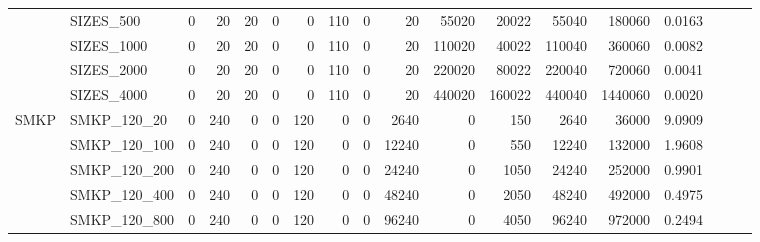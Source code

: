 \begin{table}[h]
{\begin{tabular}{llrrrrrrrrrrrrrlll}
			& SIZES\_500                   & 0            & 20          & 20         & 0            & 0           & 110        & 0       & 20       & 55020  & 20022   & 55040    & 180060     & 0.0163    &                          &                          &                          \\
			& SIZES\_1000                  & 0            & 20          & 20         & 0            & 0           & 110        & 0       & 20       & 110020 & 40022   & 110040   & 360060     & 0.0082    &                          &                          &                          \\
			& SIZES\_2000                  & 0            & 20          & 20         & 0            & 0           & 110        & 0       & 20       & 220020 & 80022   & 220040   & 720060     & 0.0041    &                          &                          &                          \\
			& SIZES\_4000                  & 0            & 20          & 20         & 0            & 0           & 110        & 0       & 20       & 440020 & 160022  & 440040   & 1440060    & 0.0020    &                          &                          &                          \\ \hline
			\multirow{5}{*}{SMKP}       & SMKP\_120\_20                & 0            & 240         & 0          & 0            & 120         & 0          & 0       & 2640     & 0      & 150     & 2640     & 36000      & 9.0909    &                          &                          &                          \\
			& SMKP\_120\_100               & 0            & 240         & 0          & 0            & 120         & 0          & 0       & 12240    & 0      & 550     & 12240    & 132000     & 1.9608    &                          &                          &                          \\
			& SMKP\_120\_200               & 0            & 240         & 0          & 0            & 120         & 0          & 0       & 24240    & 0      & 1050    & 24240    & 252000     & 0.9901    &                          &                          &                          \\
			& SMKP\_120\_400               & 0            & 240         & 0          & 0            & 120         & 0          & 0       & 48240    & 0      & 2050    & 48240    & 492000     & 0.4975    &                          &                          &                          \\
			& SMKP\_120\_800               & 0            & 240         & 0          & 0            & 120         & 0          & 0       & 96240    & 0      & 4050    & 96240    & 972000     & 0.2494    &                          &                          &                          \\ \hline

\end{tabular}}
\end{table}
